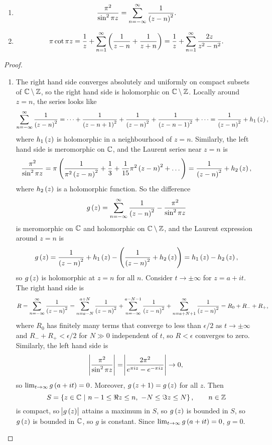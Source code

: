 \begin{lemma}
\hfill
\begin{enumerate}
\item
$$ \dfrac{\pi^2}{\sin^2 \pi z} = \sum_{n = -\infty}^\infty \dfrac{1}{\br{z - n}^2}. $$
\item
$$ \pi\cot \pi z = \dfrac{1}{z} + \sum_{n = 1}^\infty \br{\dfrac{1}{z - n} + \dfrac{1}{z + n}} = \dfrac{1}{z} + \sum_{n = 1}^\infty \dfrac{2z}{z^2 - n^2}. $$
\end{enumerate}
\end{lemma}

\begin{proof}
\hfill
\begin{enumerate}
\item The right hand side converges absolutely and uniformly on compact subsets of $ \mathbb{C} \setminus \mathbb{Z} $, so the right hand side is holomorphic on $ \mathbb{C} \setminus \mathbb{Z} $. Locally around $ z = n $, the series looks like
$$ \sum_{n = -\infty}^\infty \dfrac{1}{\br{z - n}^2} = \dots + \dfrac{1}{\br{z - n + 1}^2} + \dfrac{1}{\br{z - n}^2} + \dfrac{1}{\br{z - n - 1}^2} + \dots = \dfrac{1}{\br{z - n}^2} + h_1\br{z}, $$
where $ h_1\br{z} $ is holomorphic in a neighbourhood of $ z = n $. Similarly, the left hand side is meromorphic on $ \mathbb{C} $, and the Laurent series near $ z = n $ is
$$ \dfrac{\pi^2}{\sin^2 \pi z} = \pi\br{\dfrac{1}{\pi^2\br{z - n}^2} + \dfrac{1}{3} + \dfrac{1}{15}\pi^2\br{z - n}^2 + \dots} = \dfrac{1}{\br{z - n}^2} + h_2\br{z}, $$
where $ h_2\br{z} $ is a holomorphic function. So the difference
$$ g\br{z} = \sum_{n = -\infty}^\infty \dfrac{1}{\br{z - n}^2} - \dfrac{\pi^2}{\sin^2 \pi z} $$
is meromorphic on $ \mathbb{C} $ and holomorphic on $ \mathbb{C} \setminus \mathbb{Z} $, and the Laurent expression around $ z = n $ is
$$ g\br{z} = \dfrac{1}{\br{z - n}^2} + h_1\br{z} - \br{\dfrac{1}{\br{z - n}^2} + h_2\br{z}} = h_1\br{z} - h_2\br{z}, $$
so $ g\br{z} $ is holomorphic at $ z = n $ for all $ n $. Consider $ t \to \pm\infty $ for $ z = a + it $. The right hand side is
$$ R = \sum_{n = -\infty}^\infty \dfrac{1}{\br{z - n}^2} = \sum_{n = a - N}^{a + N} \dfrac{1}{\br{z - n}^2} + \sum_{n = -\infty}^{a - N - 1} \dfrac{1}{\br{z - n}^2} + \sum_{n = a + N + 1}^\infty \dfrac{1}{\br{z - n}^2} = R_0 + R_- + R_+, $$
where $ R_0 $ has finitely many terms that converge to less than $ \epsilon / 2 $ as $ t \to \pm\infty $ and $ R_- + R_+ < \epsilon / 2 $ for $ N \gg 0 $ independent of $ t $, so $ R < \epsilon $ converges to zero. Similarly, the left hand side is
$$ \abs{\dfrac{\pi^2}{\sin^2 \pi z}} = \abs{\dfrac{2\pi^2}{e^{\pi iz} - e^{-\pi iz}}} \to 0, $$
so $ \lim_{t \to \infty} g\br{a + it} = 0 $. Moreover, $ g\br{z + 1} = g\br{z} $ for all $ z $. Then
$$ S = \cbr{z \in \CC \st n - 1 \le \Re z \le n, \ -N \le \Im z \le N}, \qquad n \in \ZZ $$
is compact, so $ \abs{g\br{z}} $ attains a maximum in $ S $, so $ g\br{z} $ is bounded in $ S $, so $ g\br{z} $ is bounded in $ \mathbb{C} $, so $ g $ is constant. Since $ \lim_{t \to \infty} g\br{a + it} = 0 $, $ g = 0 $.


\end{enumerate}
\end{proof}
